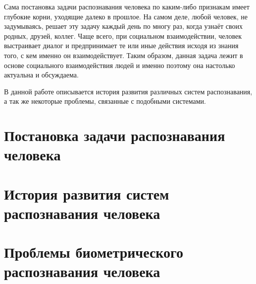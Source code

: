 \documentclass[14pt, a4paper]{extarticle}
\begin{document}
Сама постановка задачи распознавания человека по каким-либо признакам имеет глубокие корни, уходящие далеко в прошлое. На самом деле, любой человек, не задумываясь, решает эту задачу каждый день по многу раз, когда узнаёт своих родных, друзей, коллег. Чаще всего, при социальном взаимодействии, человек выстраивает диалог и предпринимает те или иные действия исходя из знания того, с кем именно он взаимодействует. Таким образом, данная задача лежит в основе социального взаимодействия людей и именно поэтому она настолько актуальна и обсуждаема.

В данной работе описывается история развития различных систем распознавания, а так же некоторые проблемы, связанные с подобными системами.

\section{Постановка задачи распознавания человека}
\section{История развития систем распознавания человека}
\section{Проблемы биометрического распознавания человека}
	
\newpage

\end{document}
